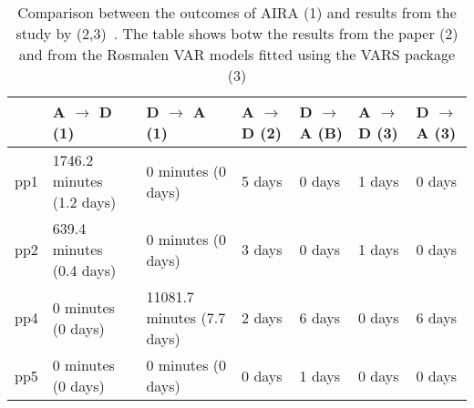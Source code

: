 \begin{table*}[ht]
\centering
\begin{tabular}{rllllll}
  \toprule
 & A $\rightarrow$ D (1) & D $\rightarrow$ A (1) & A $\rightarrow$ D (2) & D $\rightarrow$ A (B) & A $\rightarrow$ D (3) & D $\rightarrow$ A (3) \\ 
  \midrule
pp1 & 1746.2 minutes (1.2 days) & 0 minutes (0 days) & 5 days & 0 days & 1 days & 0 days \\ 
  pp2 & 639.4 minutes (0.4 days) & 0 minutes (0 days) & 3 days & 0 days & 1 days & 0 days \\ 
  pp4 & 0 minutes (0 days) & 11081.7 minutes (7.7 days) & 2 days & 6 days & 0 days & 6 days \\ 
  pp5 & 0 minutes (0 days) & 0 minutes (0 days) & 0 days & 1 days & 0 days & 0 days \\ 
   \bottomrule
\end{tabular}
\caption{Comparison between the outcomes of AIRA (1) and results from the study by \citeauthor{RefWorks:4} (2,3)~\cite{RefWorks:4}. The table shows botw the results from the paper (2) and from the Rosmalen VAR models fitted using the VARS package (3)} 
\label{tab:comparison}
\end{table*}
